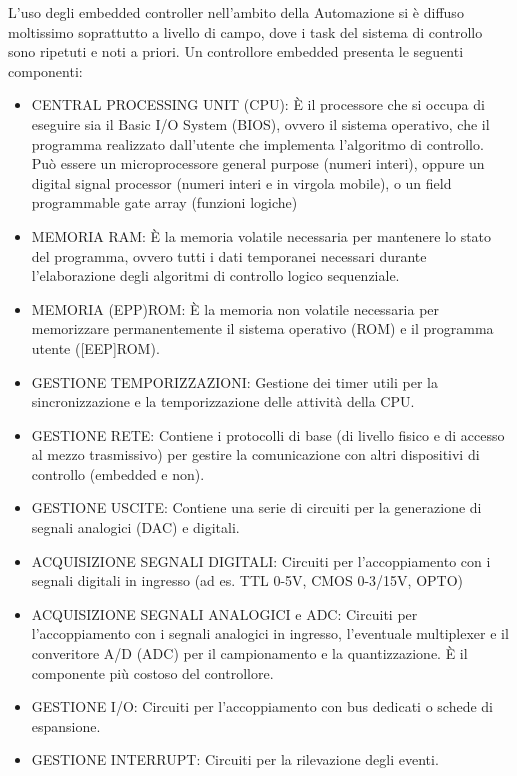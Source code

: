 \documentclass[10pt, letterpaper]{report}
\begin{document}
L'uso degli embedded controller nell'ambito della Automazione si è diffuso moltissimo
soprattutto a livello di campo, dove i task del sistema di controllo sono ripetuti e noti
a priori. Un controllore embedded presenta le seguenti componenti:\begin{itemize}
    \item CENTRAL PROCESSING UNIT (CPU):
    È il processore che si occupa di eseguire sia il Basic I/O System (BIOS), ovvero il
    sistema operativo, che il programma realizzato dall'utente che implementa
    l'algoritmo di controllo.  Può essere un microprocessore general purpose (numeri interi), oppure
    un digital signal processor (numeri interi e in virgola mobile), o un field
    programmable gate array (funzioni logiche) 
    \item MEMORIA RAM:
    È la memoria volatile necessaria per mantenere lo stato del programma, ovvero
    tutti i dati temporanei necessari durante l'elaborazione degli algoritmi di controllo
    logico sequenziale.
    \item MEMORIA (EPP)ROM:
    È la memoria non volatile necessaria per memorizzare permanentemente il
    sistema operativo (ROM) e il programma utente ([EEP]ROM).
    \item GESTIONE TEMPORIZZAZIONI:
    Gestione dei timer utili per la sincronizzazione e la temporizzazione delle attività
    della CPU.
    \item GESTIONE RETE:
    Contiene i protocolli di base (di livello fisico e di accesso al mezzo trasmissivo) per
    gestire la comunicazione con altri dispositivi di controllo (embedded e non).
    \item GESTIONE USCITE:
Contiene una serie di circuiti per la generazione di segnali analogici (DAC) e
digitali.
\item ACQUISIZIONE SEGNALI DIGITALI:
Circuiti per l'accoppiamento con i segnali digitali in ingresso (ad es. TTL 0-5V,
CMOS 0-3/15V, OPTO)
    \item ACQUISIZIONE SEGNALI ANALOGICI e ADC:
    Circuiti per l'accoppiamento con i segnali analogici in ingresso, l'eventuale
    multiplexer e il converitore A/D (ADC) per il campionamento e la
    quantizzazione. È il componente più costoso del controllore.
    \item GESTIONE I/O:
    Circuiti per l'accoppiamento con bus dedicati o schede di espansione.
    \item GESTIONE INTERRUPT:
    Circuiti per la rilevazione degli eventi.
\end{itemize}
\end{document}

